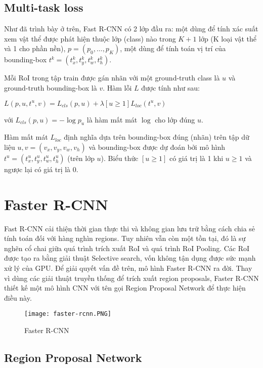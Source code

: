 \documentclass[../thesis.tex]{subfiles}
\begin{document}
\subsection{Multi-task loss}

Như đã trình bày ở trên, Fast R-CNN có 2 lớp đầu ra: một dùng để tính xác suất xem vật thể được phát hiện thuộc lớp (class) nào trong $K+1$ lớp (K loại vật thể và 1 cho phần nền), $p = (p_0,\ldots, p_K)$, một dùng để tính toán vị trí của bounding-box $t^k = \left(t^k_x, t^k_y, t^k_w, t^k_h\right)$.

Mỗi RoI trong tập train được gán nhãn với một ground-truth class là $u$ và ground-truth bounding-box là $v$. Hàm lỗi $L$ được tính như sau:

$L\left(p, u, t^u, v\right) = L_{cls}\left(p, u\right) + \lambda\left[u\geq1\right]L_{loc}\left(t^u, v\right)$

với $L_{cls}\left(p, u\right) = -\log p_u$ là hàm mất mát $\log$ cho lớp đúng $u$.

Hàm mất mát $L_{loc}$ định nghĩa dựa trên bounding-box đúng (nhãn) trên tập dữ liệu $u, v = \left(v_x, v_y, v_w, v_h\right)$  và bounding-box được dự đoán bởi mô hình $t^u = \left(t^u_x, t^u_y, t^u_w, t^u_h\right)$ (trên lớp $u$). Biểu thức $\left[u \geq 1\right]$ có giá trị là 1 khi $u \geq 1$ và ngược lại có giá trị là 0.


\section{Faster R-CNN}

Fast R-CNN cải thiện thời gian thực thi và không gian lưu trữ bằng cách chia sẻ tính toán đối với hàng nghìn regions. Tuy nhiên vẫn còn một tồn tại, đó là sự nghẽn cổ chai giữa quá trình trích xuất RoI và quá trình RoI Pooling. Các RoI được tạo ra bằng giải thuật Selective search, vốn không tận dụng được sức mạnh xử lý của GPU. Để giải quyết vấn đề trên, mô hình Faster R-CNN ra đời. Thay vì dùng các giải thuật truyền thống để trích xuất region proposals, Faster R-CNN thiết kế một mô hình CNN với tên gọi Region Proposal Network để thực hiện điều này.

\begin{figure}[H]
	\centering
	\texttt{[image: faster-rcnn.PNG]}
	\caption{Faster R-CNN}\label{Fig:faster_rcnn}
\end{figure}

\subsection{Region Proposal Network}
\end{document}
